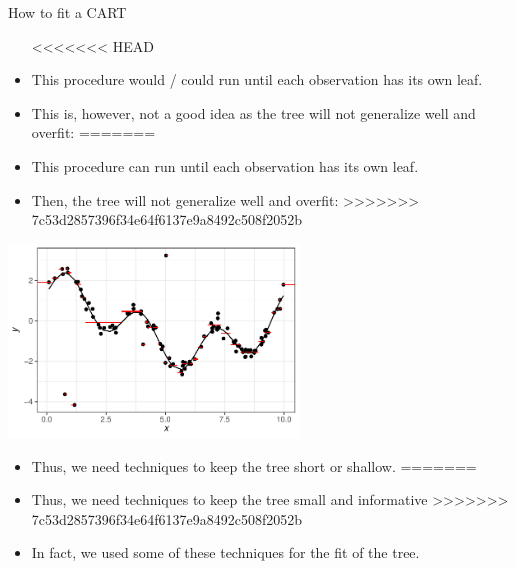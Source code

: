 \documentclass[11pt,compress,t,notes=noshow, xcolor=table]{beamer}
\begin{document}
\begin{vbframe}{How to fit a CART}
\begin{itemize}
<<<<<<< HEAD
\item This procedure would / could run until each observation has its own leaf.
\item This is, however, not a good idea as the tree will not generalize well and overfit:
=======
\item This procedure can run until each observation has its own leaf.
\item Then, the tree will not generalize well and overfit:
>>>>>>> 7c53d2857396f34e64f6137e9a8492c508f2052b
\end{itemize}

{\centering \includegraphics[width=0.58\textwidth]{figure/tree-overfitting-prediction.pdf} 

}

\begin{itemize}
<<<<<<< HEAD
\item Thus, we need techniques to keep the tree short or shallow.
=======
\item Thus, we need techniques to keep the tree small and informative
>>>>>>> 7c53d2857396f34e64f6137e9a8492c508f2052b
\item In fact, we used some of these techniques for the fit of the tree.
\end{itemize}

\end{vbframe}
\end{document}
